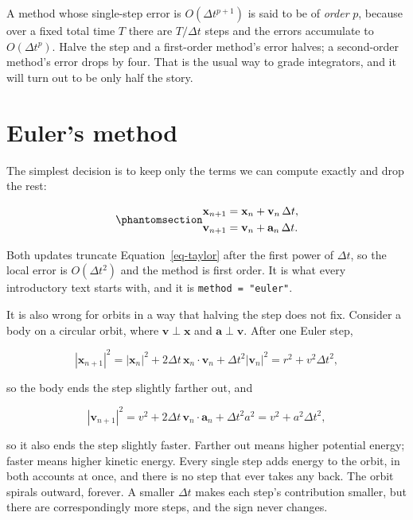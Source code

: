 \documentclass[
  10.5pt,
  letterpaper,
]{scrbook}
\theoremstyle{definition}
\theoremstyle{plain}
\theoremstyle{remark}
\begin{document}
A method whose single-step error is \(O(\Delta t^{p+1})\) is said to be
of \emph{order} \(p\), because over a fixed total time \(T\) there are
\(T/\Delta t\) steps and the errors accumulate to \(O(\Delta t^p)\).
Halve the step and a first-order method's error halves; a second-order
method's error drops by four. That is the usual way to grade
integrators, and it will turn out to be only half the story.

\section{Euler's method}\label{eulers-method}

The simplest decision is to keep only the terms we can compute exactly
and drop the rest:

\begin{equation}\protect\phantomsection\label{eq-euler}{
\begin{aligned}
\mathbf{x}_{n+1} &= \mathbf{x}_n + \mathbf{v}_n\,\Delta t, \\
\mathbf{v}_{n+1} &= \mathbf{v}_n + \mathbf{a}_n\,\Delta t.
\end{aligned}
}\end{equation}

Both updates truncate Equation~\ref{eq-taylor} after the first power of
\(\Delta t\), so the local error is \(O(\Delta t^2)\) and the method is
first order. It is what every introductory text starts with, and it is
\texttt{method\ =\ "euler"}.

It is also wrong for orbits in a way that halving the step does not fix.
Consider a body on a circular orbit, where
\(\mathbf{v} \perp \mathbf{x}\) and \(\mathbf{a} \perp \mathbf{v}\).
After one Euler step,

\[
|\mathbf{x}_{n+1}|^2 = |\mathbf{x}_n|^2 + 2\Delta t\,\mathbf{x}_n\cdot\mathbf{v}_n + \Delta t^2 |\mathbf{v}_n|^2 = r^2 + v^2\Delta t^2,
\]

so the body ends the step slightly farther out, and

\[
|\mathbf{v}_{n+1}|^2 = v^2 + 2\Delta t\,\mathbf{v}_n\cdot\mathbf{a}_n + \Delta t^2 a^2 = v^2 + a^2\Delta t^2,
\]

so it also ends the step slightly faster. Farther out means higher
potential energy; faster means higher kinetic energy. Every single step
adds energy to the orbit, in both accounts at once, and there is no step
that ever takes any back. The orbit spirals outward, forever. A smaller
\(\Delta t\) makes each step's contribution smaller, but there are
correspondingly more steps, and the sign never changes.
\end{document}

